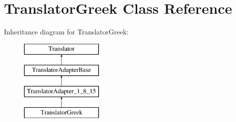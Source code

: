 \hypertarget{class_translator_greek}{}\section{Translator\+Greek Class Reference}
\label{class_translator_greek}
Inheritance diagram for Translator\+Greek\+:\begin{figure}[H]
\begin{center}
\leavevmode
\includegraphics[height=4.000000cm]{class_translator_greek}
\end{center}
\end{figure}
